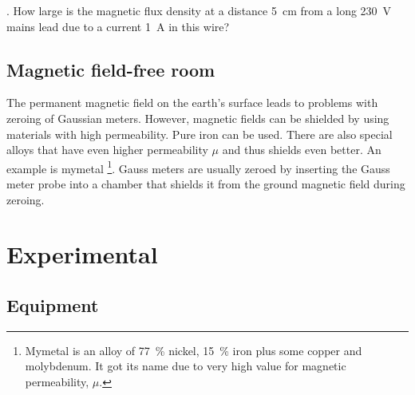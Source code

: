 \documentclass[../Elmag-labhefte-2020.tex]{subfiles}
\begin{document}
{. How large is the magnetic flux density at a distance \SI{5}{\cm} from a long \SI{230}{\volt} mains lead due to a current \SI{1}{\ampere} in this wire?}

\subsection{Magnetic field-free room \label{ch.mymetall}}

The permanent magnetic field on the earth's surface leads to problems with zeroing of Gaussian meters. However, magnetic fields can be shielded by using materials with high permeability. Pure iron can be used. There are also special alloys that have even higher permeability $\mu$ and thus shields even better. An example is mymetal \footnote{Mymetal is an alloy of \SI{77}{\percent} nickel, \SI{15}{\percent} iron plus some copper and molybdenum. It got its name due to very high value for magnetic permeability, $\mu$.}. Gauss meters are usually zeroed by inserting the Gauss meter probe into a chamber that shields it from the ground magnetic field during zeroing.


\section{Experimental \label{ch.magnetfelt.eksperimentelt}}

\subsection{Equipment}
\end{document}
